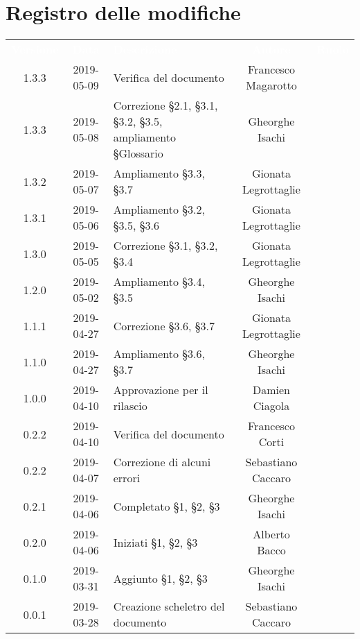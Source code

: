 \section*{Registro delle modifiche}
{
	\renewcommand{\arraystretch}{1.5}
	\centering
	\begin{longtable}{ c c C{6cm} c c }
		\textcolor{white}{\textbf{Versione}} & \textcolor{white}{\textbf{Data}} & \textcolor{white}{\textbf{Descrizione}} & \textcolor{white}{\textbf{Autore}} & \textcolor{white}{\textbf{Ruolo}}\\
		1.3.3 &  2019-05-09 & Verifica del documento & Francesco Magarotto & \ver{} \\ 
				
		1.3.3 & 2019-05-08 & Correzione \S2.1, \S3.1, \S3.2, \S3.5, ampliamento \S Glossario & Gheorghe Isachi & \reda{} \\
		
		1.3.2 & 2019-05-07 & Ampliamento \S3.3, \S3.7 & Gionata Legrottaglie & \reda{} \\
		
		1.3.1 & 2019-05-06 & Ampliamento \S3.2, \S3.5, \S3.6 & Gionata Legrottaglie & \reda{} \\
				
		1.3.0 & 2019-05-05 & Correzione \S3.1, \S3.2, \S3.4 & Gionata Legrottaglie & \reda{} \\
				
		1.2.0 & 2019-05-02 & Ampliamento \S3.4, \S3.5 & Gheorghe Isachi & \reda{} \\	
		
		1.1.1 & 2019-04-27 & Correzione \S3.6, \S3.7 & Gionata Legrottaglie & \reda{} \\	
		
		1.1.0 & 2019-04-27 & Ampliamento \S3.6, \S3.7 & Gheorghe Isachi & \reda{} \\
		
		1.0.0 & 2019-04-10 & Approvazione per il rilascio & Damien Ciagola & \RdP{} \\ 
			
		0.2.2 & 2019-04-10 & Verifica del documento & Francesco Corti & \ver{} \\ 
		
		0.2.2 & 2019-04-07 & Correzione di alcuni errori & Sebastiano Caccaro & \reda{} \\ 

		0.2.1 & 2019-04-06 & Completato \S1, \S2, \S3 & Gheorghe Isachi & \reda{} \\
		
		0.2.0 & 2019-04-06 & Iniziati \S1, \S2, \S3 & Alberto Bacco & \reda{} \\
		
		0.1.0 & 2019-03-31 & Aggiunto \S1, \S2, \S3 & Gheorghe Isachi & \reda{} \\
		
		0.0.1 & 2019-03-28 & Creazione scheletro del documento & Sebastiano Caccaro & \reda{}
		
	\end{longtable}

}